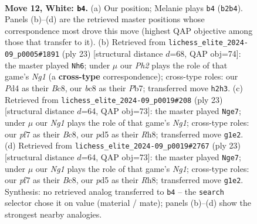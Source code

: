 \documentclass[11pt]{article}
\begin{document}
\clearpage

\begin{figure}[p]\centering
\begin{subfigure}{0.46\textwidth}\centering
\resizebox{\linewidth}{!}{%
\newchessgame
\chessboard[
  setfen={r1b1k2r/pp1nbppp/2n1p3/q2pP3/3P3Q/3B1PP1/PP1N3P/R1B1K1NR w KQ - 3 12},
  showmover=false,
  pgfstyle=straightmove, color=movearrow, markmove={b2-b4}
]}
\caption{}
\end{subfigure}\hfill
\begin{subfigure}{0.46\textwidth}\centering
\resizebox{\linewidth}{!}{%
\newchessgame
\chessboard[
  setfen={r1b1k1nr/pp3ppp/1qnbp3/3pN3/3P1P2/1QP1B1P1/PP1N3P/R3KB1R b KQkq - 0 12},
  showmover=false,
  pgfstyle=straightmove, color=movearrow, markmove={g8-h6}
]}
\caption{}
\end{subfigure}
\\[4pt]
\begin{subfigure}{0.46\textwidth}\centering
\resizebox{\linewidth}{!}{%
\newchessgame
\chessboard[
  setfen={r1b1k1nr/pp3ppp/1qnbp3/3pN3/3P1P2/1QPBB3/PP1N2PP/R3K2R b KQkq - 4 12},
  showmover=false,
  pgfstyle=straightmove, color=movearrow, markmove={g8-e7}
]}
\caption{}
\end{subfigure}\hfill
\begin{subfigure}{0.46\textwidth}\centering
\resizebox{\linewidth}{!}{%
\newchessgame
\chessboard[
  setfen={r1b1k1nr/pp3ppp/1qnbp3/3pN3/3P1P2/1QPBB3/PP1N2PP/R3K2R b KQkq - 4 12},
  showmover=false,
  pgfstyle=straightmove, color=movearrow, markmove={g8-e7}
]}
\caption{}
\end{subfigure}
\caption{\textbf{Move 12, White: \texttt{b4}.} (a) Our position; Melanie plays \texttt{b4} (\texttt{b2b4}). Panels (b)--(d) are the retrieved master positions whose correspondence most drove this move (highest QAP objective among those that transfer to it). (b) Retrieved from \texttt{lichess\_elite\_2024-09\_p0005\#1891} (ply 23) [structural distance $d$=68, QAP obj=74]: the master played \texttt{Nh6}; under $\mu$ our \emph{Ph2} plays the role of that game's \emph{Ng1} (a \textbf{cross-type} correspondence); cross-type roles: our \emph{P}d4 as their \emph{B}c8, our \emph{b}c8 as their \emph{P}b7; transferred move \texttt{h2h3}. (c) Retrieved from \texttt{lichess\_elite\_2024-09\_p0019\#208} (ply 23) [structural distance $d$=64, QAP obj=73]: the master played \texttt{Nge7}; under $\mu$ our \emph{Ng1} plays the role of that game's \emph{Ng1}; cross-type roles: our \emph{p}f7 as their \emph{B}c8, our \emph{p}d5 as their \emph{R}h8; transferred move \texttt{g1e2}. (d) Retrieved from \texttt{lichess\_elite\_2024-09\_p0019\#2767} (ply 23) [structural distance $d$=64, QAP obj=73]: the master played \texttt{Nge7}; under $\mu$ our \emph{Ng1} plays the role of that game's \emph{Ng1}; cross-type roles: our \emph{p}f7 as their \emph{B}c8, our \emph{p}d5 as their \emph{R}h8; transferred move \texttt{g1e2}. Synthesis: no retrieved analog transferred to \texttt{b4} -- the \texttt{search} selector chose it on value (material / mate); panels (b)--(d) show the strongest nearby analogies.}
\label{fig:thought-m22}
\end{figure}
\end{document}
